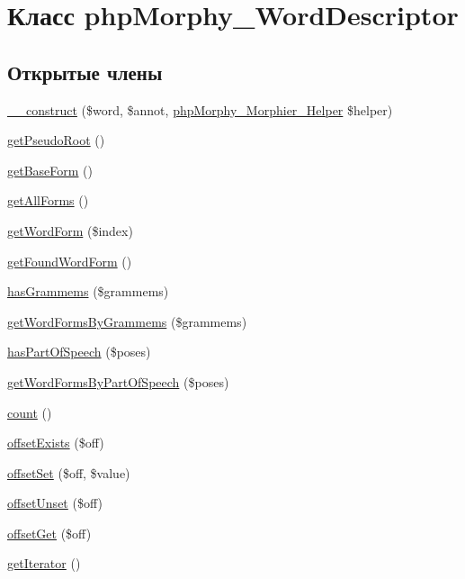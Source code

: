\hypertarget{classphpMorphy__WordDescriptor}{
\section{Класс phpMorphy\_\-WordDescriptor}
\label{classphpMorphy__WordDescriptor}
}
\subsection*{Открытые члены}
\begin{DoxyCompactItemize}
\item 
\hyperlink{classphpMorphy__WordDescriptor_adcd5834c9309bb678cde544713e4cd58}{\_\-\_\-construct} (\$word, \$annot, \hyperlink{classphpMorphy__Morphier__Helper}{phpMorphy\_\-Morphier\_\-Helper} \$helper)
\item 
\hyperlink{classphpMorphy__WordDescriptor_a5747492e1165fbdf0cec196c43f13ac0}{getPseudoRoot} ()
\item 
\hyperlink{classphpMorphy__WordDescriptor_a631aa1a6316b5cb1f3c18e0b79680454}{getBaseForm} ()
\item 
\hyperlink{classphpMorphy__WordDescriptor_ad0baf300b8e115d89f47f49855a1e951}{getAllForms} ()
\item 
\hyperlink{classphpMorphy__WordDescriptor_a236ea6caf054808fabc1f2768e6357ab}{getWordForm} (\$index)
\item 
\hyperlink{classphpMorphy__WordDescriptor_a4ec7caad1df3d72bc2f4aea0298a08ac}{getFoundWordForm} ()
\item 
\hyperlink{classphpMorphy__WordDescriptor_a177a14141d457de54aee96777727f2f5}{hasGrammems} (\$grammems)
\item 
\hyperlink{classphpMorphy__WordDescriptor_aaeefecec92bb11cf05edcc4cab8149d1}{getWordFormsByGrammems} (\$grammems)
\item 
\hyperlink{classphpMorphy__WordDescriptor_a0e1db696804fae13e215c1db77a3b75d}{hasPartOfSpeech} (\$poses)
\item 
\hyperlink{classphpMorphy__WordDescriptor_a5e03cf059f6e3c44784838988316847a}{getWordFormsByPartOfSpeech} (\$poses)
\item 
\hyperlink{classphpMorphy__WordDescriptor_a49c69b4849184c3a19666a4ff408f9ca}{count} ()
\item 
\hyperlink{classphpMorphy__WordDescriptor_a93584086d466dac1f43d12fdd82cf1c6}{offsetExists} (\$off)
\item 
\hyperlink{classphpMorphy__WordDescriptor_a45fbfc694d5a543ea525ac5525bb0535}{offsetSet} (\$off, \$value)
\item 
\hyperlink{classphpMorphy__WordDescriptor_a0bc93324f25b19598ba6dac44ceafe7c}{offsetUnset} (\$off)
\item 
\hyperlink{classphpMorphy__WordDescriptor_ac5e5c09708708f018f9f6331299a2af1}{offsetGet} (\$off)
\item 
\hyperlink{classphpMorphy__WordDescriptor_ab8f33e0e048840dba32c3787f9da997e}{getIterator} ()
\end{DoxyCompactItemize}

